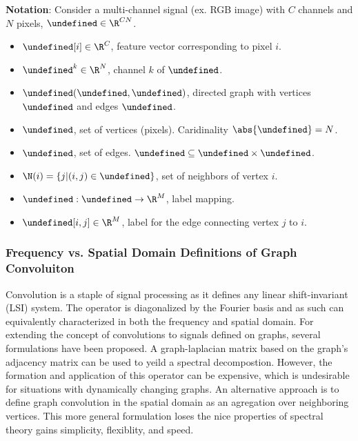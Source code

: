 \documentclass[12pt,a4paper,reqno]{amsart}
\let\bm\undefined
\newcommand{\bm}[1]{\mathbf{#1}}
\let\x\undefined
\newcommand{\x}{\bm{x}}
\let\G\undefined
\newcommand{\G}{\mathcal{G}}
\let\V\undefined
\newcommand{\V}{\mathcal{V}}
\let\E\undefined
\newcommand{\E}{\mathcal{E}}
\let\L\undefined
\newcommand{\L}{\mathcal{L}}
\begin{document}
\textbf{Notation}: Consider a multi-channel signal (ex. RGB image) with 
$C$ channels and $N$ pixels, $\x \in \R^{CN}$. 
\begin{itemize}
\item $\x[i] \in \R^C$, feature vector corresponding to pixel $i$.  \\
\item $\x^k \in \R^N$, channel $k$ of $\x$.  \\
\item $\G(\V,\E)$, directed graph with vertices $\V$ and edges $\E$. \\
\item $\V$, set of vertices (pixels). Caridinality $\abs{\V} = N$. \\
\item $\E$, set of edges. $\E \subseteq \V \times \V$. \\
\item $\N(i) = \{j | (i,j) \in \E \}$, set of neighbors of vertex $i$. \\
\item $\L: \E \rightarrow \R^M$, label mapping.
\item $\L[i,j] \in \R^M$, label for the edge connecting vertex $j$ to $i$.
\end{itemize}

\subsubsection{Frequency vs. Spatial Domain Definitions of Graph Convoluiton}
Convolution is a staple of signal processing as it defines any linear
shift-invariant (LSI) system. The operator is diagonalized by the Fourier basis
and as such can equivalently characterized in both the frequency and spatial
domain. For extending the concept of convolutions to signals defined on graphs, 
several formulations have been proposed. A graph-laplacian matrix based on the
graph's adjacency matrix can be used to yeild a spectral decompostion. However,
the formation and application of this operator can be expensive, which is
undesirable for situations with dynamically changing graphs. An alternative
approach is to define graph convolution in the spatial domain as an agregation
over neighboring vertices. This more general formulation loses the nice
properties of spectral theory gains simplicity, flexiblity, and speed.
\end{document}
